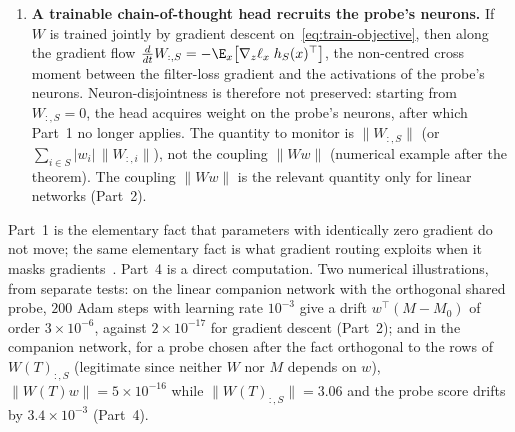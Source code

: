 \begin{theorem}
\begin{enumerate}
  \item \textbf{A trainable chain-of-thought head recruits the probe's neurons.} If $W$ is trained jointly by gradient descent on~\eqref{eq:train-objective}, then along the gradient flow $\tfrac{d}{dt} W_{:,S} = -\E_x\big[\nabla_z \ell_x\; h_S(x)^\top\big]$, the non-centred cross moment between the filter-loss gradient and the activations of the probe's neurons. Neuron-disjointness is therefore not preserved: starting from $W_{:,S} = 0$, the head acquires weight on the probe's neurons, after which Part~1 no longer applies. The quantity to monitor is $\|W_{:,S}\|$ (or $\sum_{i \in S} |w_i|\, \|W_{:,i}\|$), not the coupling $\|Ww\|$ (numerical example after the theorem). The coupling $\|Ww\|$ is the relevant quantity only for linear networks (Part~2).
\end{enumerate}
\end{theorem}

Part~1 is the elementary fact that parameters with identically zero gradient do not move; the same elementary fact is what gradient routing exploits when it masks gradients~\cite{cloud2024}. Part~4 is a direct computation. Two numerical illustrations, from separate tests: on the linear companion network with the orthogonal shared probe, $200$ Adam steps with learning rate $10^{-3}$ give a drift $w^\top(M-M_0)$ of order $3\times10^{-6}$, against $2\times10^{-17}$ for gradient descent (Part~2); and in the companion network, for a probe chosen after the fact orthogonal to the rows of $W(T)_{:,S}$ (legitimate since neither $W$ nor $M$ depends on $w$), $\|W(T)w\|=5\times10^{-16}$ while $\|W(T)_{:,S}\|=3.06$ and the probe score drifts by $3.4\times10^{-3}$ (Part~4).


